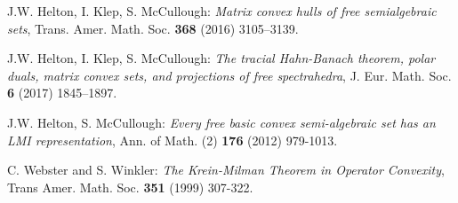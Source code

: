 \begin{thebibliography}{1}
	J.W. Helton, I. Klep, S. McCullough:
	{\it Matrix convex hulls of free semialgebraic sets}, Trans. Amer. Math. Soc. {\bf 368} (2016) 3105--3139.
	
	
	J.W. Helton, I. Klep, S. McCullough:
	{\it The tracial Hahn-Banach theorem, polar duals, matrix convex sets, and projections of free spectrahedra}, J. Eur. Math. Soc. {\bf 6} 
	(2017) 1845--1897.
	
	
	J.W. Helton, S. McCullough: {\it Every free basic convex semi-algebraic set has an LMI representation}, Ann. of Math. (2) {\bf 176} 
	(2012) 979-1013.
	
	
	C. Webster and S. Winkler:
	{\it The Krein-Milman Theorem in Operator Convexity},  Trans Amer. Math. Soc. {\bf 351} (1999) 307-322.

\end{thebibliography}